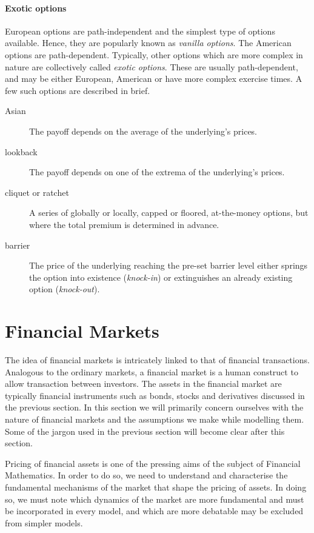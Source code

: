 \paragraph{Exotic options}
European options are path-independent and the simplest type of options available. Hence, they are popularly known as \emph{vanilla options}. The American options are path-dependent. Typically, other options which are more complex in nature are collectively called \emph{exotic options}. These are usually path-dependent, and may be either European, American or have more complex exercise times. A few such options are described in brief.
\begin{description}
	\item[Asian] The payoff depends on the average of the underlying's prices.
	\item[lookback] The payoff depends on one of the extrema of the underlying's prices.
	\item[cliquet or ratchet] A series of globally or locally, capped or floored, at-the-money options, but where the total premium is determined in advance.
	\item[barrier] The price of the underlying reaching the pre-set barrier level either springs the option into existence (\emph{knock-in}) or extinguishes an already existing option (\emph{knock-out}).
\end{description}



\section{Financial Markets}
\label{sec:intro-market}

The idea of financial markets is intricately linked to that of financial transactions. Analogous to the ordinary markets, a financial market is a human construct to allow transaction between investors. The assets in the financial market are typically financial instruments such as bonds, stocks and derivatives discussed in the previous section. In this section we will primarily concern ourselves with the nature of financial markets and the assumptions we make while modelling them. Some of the jargon used in the previous section will become clear after this section.

Pricing of financial assets is one of the pressing aims of the subject of Financial Mathematics. In order to do so, we need to understand and characterise the fundamental mechanisms of the market that shape the pricing of assets. In doing so, we must note which dynamics of the market are more fundamental and must be incorporated in every model, and which are more debatable may be excluded from simpler models.


